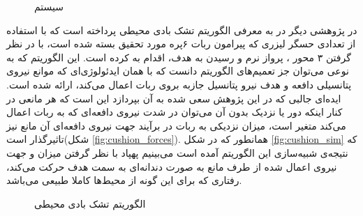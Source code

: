 \begin{figure}
\centering
{}
\caption{سیستم }
\end{figure}

در پژوهشی دیگر در  به معرفی الگوریتم  تشک بادی محیطی پرداخته است که با استفاده از تعدادی حسگر لیزری که پیرامون ربات ۶پره مورد تحقیق بسته شده است، با در نظر گرفتن ۳ محور ، پرواز نرم و رسیدن به هدف، اقدام به  کرده است. این الگوریتم که به نوعی می‌توان جز تعمیم‌های الگوریتم  دانست که با همان ایدئولوژی‌ای که موانع نیروی پتانسیلی دافعه و هدف نیرو پتانسیل جازبه بروی ربات اعمال می‌کند، ارائه شده است. ایده‌ای جالبی که در این پژوهش سعی شده به آن بپردازد این است که هر مانعی در کنار اینکه دور یا نزدیک بدون آن می‌توان در شدت نیروی دافعه‌ای که به ربات اعمال می‌کند متغیر است، میزان نزدیکی به ربات در برآیند جهت نیروی دافعه‌ای آن مانع نیز تاثیرگذار است(شکل \ref{fig:cushion_forces}). همانطور که در شکل \ref{fig:cushion_sim} که نتیجه‌ی شبیه‌سازی این الگوریتم آمده است می‌بینیم پهپاد با نظر گرفتن میزان و جهت نیروی اعمال شده از طرف مانع به صورت دندانه‌ای به سمت هدف حرکت می‌کند، رفتاری که برای این گونه از محیط‌ها کاملا طبیعی می‌باشد.

\begin{figure}
\centering
{}
\caption{الگوریتم  تشک بادی محیطی}
\end{figure}
